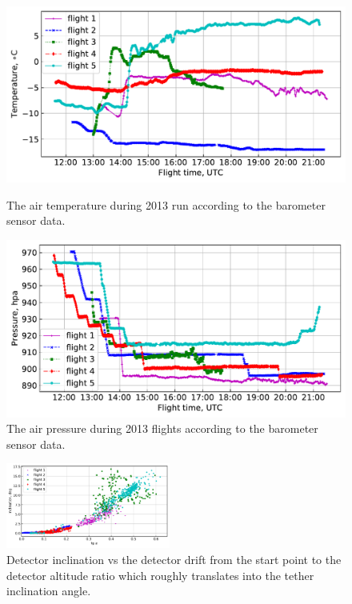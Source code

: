 \documentclass[final,5p,times,twocolumn]{elsarticle}
\begin{document}
\begin{figure}[tb]
    \begin{minipage}[t]{0.48\textwidth}
    \centering
    \includegraphics[width=\textwidth]{figs/T1.pdf}
    \caption{The air temperature during 2013 run according to the barometer sensor data.}
    \label{fig:temperature}
    \end{minipage}
    \hfill
    \begin{minipage}[t]{0.48\textwidth}
    \centering
    \includegraphics[width=\textwidth]{figs/P_hpa0.pdf}
    \caption{The air pressure during 2013 flights according to the barometer sensor data.}
    \label{fig:pressure}
    \end{minipage}
\end{figure}


\begin{figure}[tb]
    \includegraphics[width=0.48\textwidth]{figs/2013_tg-inclination.pdf}
    \caption{Detector inclination vs the detector drift from the start point to the detector altitude ratio which roughly translates into the tether inclination angle.}
\label{fig:drift-inclination}
\end{figure}
\end{document}
